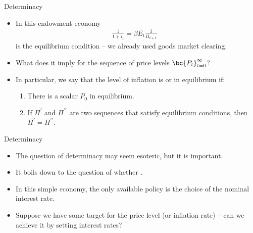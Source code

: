 \documentclass[11pt,xcolor={dvipsnames},aspectratio=159,hyperref={pdftex,pdfpagemode=UseNone,hidelinks,pdfdisplaydoctitle=true},usepdftitle=false]{beamer}
\begin{document}
\begin{frame}{Determinacy}
    \begin{itemize}
            \item In this endowment economy \begin{align*}
                \frac{1}{1+i_t} = \beta  E_t\frac{1}{\Pi_{t+1}}
            \end{align*}
            is the  equilibrium condition -- we already used goods market clearing.
            \item What does it imply for the sequence of price levels $\bc{P_t}_{t=0}^\infty$?
            \item In particular, we say that the level of inflation is  or  in equilibrium if: \begin{enumerate}
                \item There is a  scalar $P_0$ in equilibrium.
                \item If $\Pi^\prime$ and $\Pi^{\prime\prime}$ are two sequences that satisfy equilibrium conditions, then $\Pi^{\prime} = \Pi^{\prime\prime}$.
            \end{enumerate}
        \end{itemize}
    \end{frame}

\begin{frame}{Determinacy}
    \begin{itemize}
            \item The question of determinacy may seem esoteric, but it is important.
            \item It boils down to the question of whether .
            \item In this simple economy, the only available policy is the choice of the nominal interest rate.
            \item Suppose we have some target for the price level (or inflation rate) -- can we achieve it by setting interest rates?
        \end{itemize}
    \end{frame}
\end{document}
